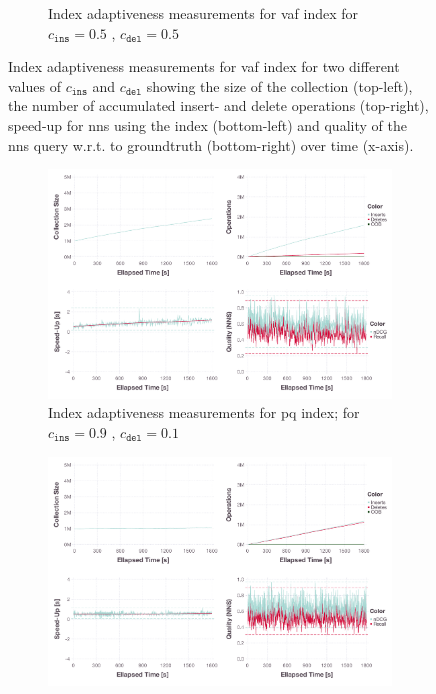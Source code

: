 \begin{figure}[p]
\begin{subfigure}[b]{\textwidth}
        \caption{Index adaptiveness measurements for \acrshort{vaf} index for $c_{\texttt{ins}} = 0.5$ , $c_{\texttt{del}} = 0.5$ }
        \label{figure:index_adaptiveness_vaf_50_50}
    \end{subfigure}
    \caption{Index adaptiveness measurements for \acrshort{vaf} index for two different values of $c_{\texttt{ins}}$ and $c_{\texttt{del}}$ showing the size of the collection (top-left), the number of accumulated insert- and delete operations (top-right), speed-up for \acrshort{nns} using the index (bottom-left) and quality of the \acrshort{nns} query w.r.t. to groundtruth (bottom-right) over time (x-axis).}
    \label{figure:index_adaptiveness_vaf}
\end{figure}

\begin{figure}[p]
    \centering
    \begin{subfigure}[b]{\textwidth}
        \centering
        \includegraphics[width=\textwidth]{figures/index/index-pq-adaptiveness-90-10-no-rebuild}
        \caption{Index adaptiveness measurements for \acrshort{pq} index; for $c_{\texttt{ins}} = 0.9$ , $c_{\texttt{del}} = 0.1$}
        \label{figure:index_adaptiveness_pq_90_10}
    \end{subfigure}
    \hfill
    \centering
    \begin{subfigure}[b]{\textwidth}
        \centering
        \includegraphics[width=\textwidth]{figures/index/index-pq-adaptiveness-50-50-no-rebuild}

\end{subfigure}
\end{figure}
